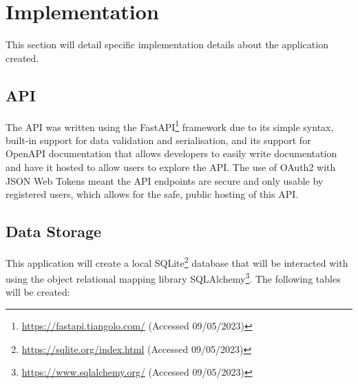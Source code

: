 
\section{Implementation}

This section will detail specific implementation details about the application created.

\subsection{API}

The API was written using the FastAPI\footnote{\url{https://fastapi.tiangolo.com/} (Accessed 09/05/2023)} framework due to its simple syntax, built-in support for data validation and serialisation, and its support for OpenAPI documentation that allows developers to easily write documentation and have it hosted to allow users to explore the API.
The use of OAuth2 with JSON Web Tokens meant the API endpoints are secure and only usable by registered users, which allows for the safe, public hosting of this API.

\subsection{Data Storage}

This application will create a local SQLite\footnote{\url{https://sqlite.org/index.html} (Accessed 09/05/2023)} database that will be interacted with using the object relational mapping library SQLAlchemy\footnote{\url{https://www.sqlalchemy.org/} (Accessed 09/05/2023)}. The following tables will be created:

